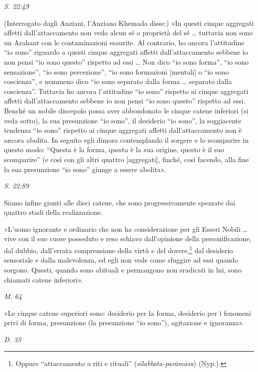 \emph{S. 22:49}


(Interrogato dagli Anziani, l’Anziano Khemada disse:) «In questi cinque
aggregati affetti dall’attaccamento non vedo alcun sé o proprietà del sé
… tuttavia non sono un Arahant con le contaminazioni esaurite. Al
contrario, ho ancora l’attitudine “io sono” riguardo a questi cinque
aggregati affetti dall’attaccamento sebbene io non pensi “io sono
questo” rispetto ad essi … Non dico “io sono forma”, “io sono
sensazione”, “io sono percezione”, “io sono formazioni [mentali] o “io
sono coscienza”, e nemmeno dico “io sono separato dalla forma … separato
dalla coscienza”. Tuttavia ho ancora l’attitudine “io sono” rispetto ai
cinque aggregati affetti dall’attaccamento sebbene io non pensi “io sono
questo” rispetto ad essi. Benché un nobile discepolo possa aver
abbondonato le cinque catene inferiori (si veda sotto), la sua
presunzione “io sono”, il desiderio “io sono”, la soggiacente tendenza
“io sono” rispetto ai cinque aggregati affetti dall’attaccamento non è
ancora abolita. In seguito egli dimora contemplando il sorgere e lo
scomparire in questo modo: “Questa è la forma, questa è la sua origine,
questo è il suo scomparire” (e così con gli altri quattro [aggregati],
finché, così facendo, alla fine la sua presunzione “io sono” giunge a
essere abolita».


\emph{S. 22:89}


 Siamo infine giunti alle dieci catene, che sono
progressivamente spezzate dai quattro stadi della realizzazione.


 «L’uomo ignorante e ordinario che non ha considerazione per
gli Esseri Nobili … vive con il suo cuore posseduto e reso schiavo
dall’opinione della personificazione, dal dubbio, dall’errata
comprensione della virtù e del dovere,\footnote{Oppure “attaccamento a riti e rituali” (\emph{sīlabbata-parāmāsa}) (Nyp.).} dal desiderio
sensoriale e dalla malevolenza, ed egli non vede come sfuggire ad essi
quando sorgono. Questi, quando sono abituali e permangono non sradicati
in lui, sono chiamati catene inferiori».


\emph{M. 64}


«Le cinque catene superiori sono: desiderio per la forma, desiderio per
i fenomeni privi di forma, presunzione (la presunzione “io sono”),
agitazione e ignoranza».


\emph{D. 33}


